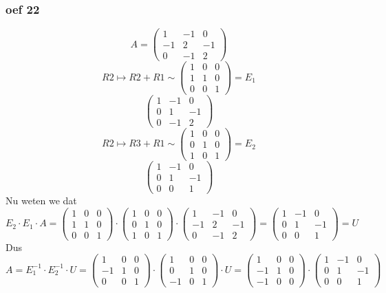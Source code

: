 \documentclass[10pt,a4paper]{article}
\begin{document}
\subsubsection*{oef 22}
\[
A=
\begin{pmatrix}
1 & -1 & 0 \\
-1 & 2 & -1 \\
0 & -1 & 2 
\end{pmatrix}
\]
\[
R2 \longmapsto R2+R1 \sim
\begin{pmatrix}
1 & 0 & 0\\
1 & 1 & 0\\
0 & 0 & 1 
\end{pmatrix}
=E_1
\]
\[
\begin{pmatrix}
1 & -1 & 0 \\
0 & 1 & -1 \\
0 & -1 & 2  
\end{pmatrix}
\]
\[
R2 \longmapsto R3+R1 \sim
\begin{pmatrix}
1 & 0 & 0\\
0 & 1 & 0\\
1 & 0 & 1 
\end{pmatrix}
=E_2
\]
\[
\begin{pmatrix}
1 & -1 & 0 \\
0 & 1 & -1 \\
0 & 0 & 1 
\end{pmatrix}
\]
Nu weten we dat
\[
E_2 \cdot E_1 \cdot A 
=
\begin{pmatrix}
1 & 0 & 0\\
1 & 1 & 0\\
0 & 0 & 1 
\end{pmatrix}
\cdot
\begin{pmatrix}
1 & 0 & 0\\
0 & 1 & 0\\
1 & 0 & 1 
\end{pmatrix}
\cdot
\begin{pmatrix}
1 & -1 & 0 \\
-1 & 2 & -1 \\
0 & -1 & 2 
\end{pmatrix}
=
\begin{pmatrix}
1 & -1 & 0 \\
0 & 1 & -1 \\
0 & 0 & 1 
\end{pmatrix}
= U
\]
Dus
\[
A = E_1^{-1} \cdot E_2^{-1} \cdot U
=
\begin{pmatrix}
1 & 0 & 0\\
-1 & 1 & 0\\
0 & 0 & 1 
\end{pmatrix}
\cdot
\begin{pmatrix}
1 & 0 & 0\\
0 & 1 & 0\\
-1 & 0 & 1 
\end{pmatrix}
\cdot
U
=
\begin{pmatrix}
1 & 0 & 0\\
-1 & 1 & 0\\
-1 & 0 & 0
\end{pmatrix}
\cdot
\begin{pmatrix}
1 & -1 & 0 \\
0 & 1 & -1 \\
0 & 0 & 1 
\end{pmatrix}
\]
\end{document}
